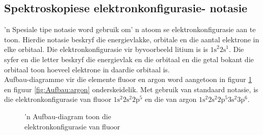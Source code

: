 \subsection*{Spektroskopiese elektronkonfigurasie- notasie}
        \label{m38741*id259749}
'n Spesiale tipe notasie word gebruik om' n atoom se elektronkonfigurasie aan te toon. Hierdie notasie beskryf die energievlakke, orbitale en die aantal elektrone in elke orbitaal. Die elektronkonfigurasie vir byvoorbeeld litium is is ${1\text{s}}^{2}{2\text{s}}^{1}$. Die syfer en die letter beskryf die energievlak en die orbitaal en die getal bokant die orbitaal toon hoeveel elektrone in daardie orbitaal is.\\
Aufbau-diagramme vir die elemente fluoor en argon word aangetoon in figuur \ref{fig:Aufbau:fluorine} en figuur \ref{fig:Aufbau:argon} onderskeidelik. Met gebruik van standaard notasie, is die elektronkonfigurasie van fluoor $1\text{s}^{2}{2}\text{s}^{2}2\text{p}^{5}$ en die van argon $1\text{s}^{2}{2}\text{s}^{2}2\text{p}^{5}{3}\text{s}^{2}3\text{p}^{6}$.\\
\begin{minipage}{.5\textwidth}
\begin{figure}[H]
\begin{center}

\caption{'n Aufbau-diagram toon die \\  elektronkonfigurasie van fluoor}
\label{fig:Aufbau:fluorine}
\end{center}
\end{figure}
\end{minipage}
